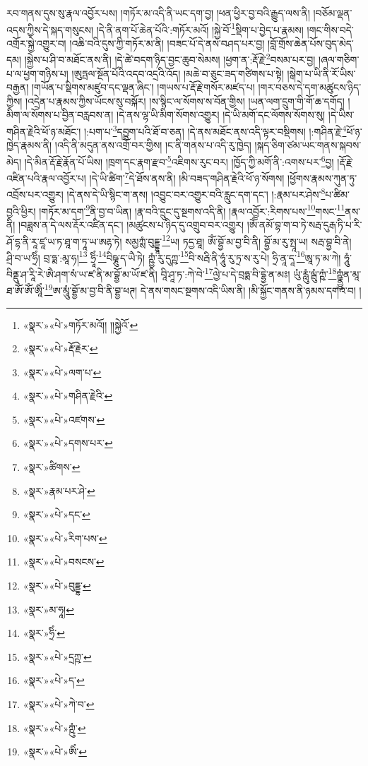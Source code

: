རབ་གནས་དུས་སུ་རྣལ་འབྱོར་པས། །གཏོར་མ་འདི་ནི་ཡང་དག་བྱ། །ཕན་ཕྱིར་བྱ་བའི་རྒྱུད་ལས་ནི། །བཅོམ་ལྡན་འདས་ཀྱིས་དེ་སྐད་གསུངས། །དེ་ནི་ནག་པོ་ཆེན་པོའི་:གཏོར་མའོ། །སྐྱེ་བོ་\footnote{«སྣར་»«པེ་»གཏོར་མའོ།། །།སྐྱེའོ་}སྡིག་པ་བྱེད་པ་རྣམས། །གང་གིས་བདེ་འགྲོར་སྐྱེ་འགྱུར་བ། །འཆི་བའི་དུས་ཀྱི་གཏོར་མ་ནི། །བཟང་པོ་དེ་ནས་བཤད་པར་བྱ། །བློ་གྲོས་ཆེན་པོས་བུད་མེད་དམ། །སྐྱེས་པ་ཤི་བ་མཐོང་ནས་ནི། །དེ་ཚེ་བདག་ཉིད་བྱང་ཆུབ་སེམས། །ཕྱག་ན་:རྡོ་རྗེ་\footnote{«སྣར་»«པེ་»རྡོ་རྗེར་}བསམ་པར་བྱ། །ཞལ་གཅིག་པ་ལ་ཕྱག་གཉིས་པ། །ཨུཏྤལ་སྔོན་པོའི་འདབ་འདྲའི་འོད། །མཆེ་བ་ཅུང་ཟད་གཙིགས་པ་སྟེ། །སྒེག་པ་ཡི་ནི་རོ་ཡིས་བརྒྱན། །གཡོན་པ་སྡིགས་མཛུབ་དང་ལྡན་ཞིང་། །གཡས་པ་རྡོ་རྗེ་གསོར་མཛད་པ། །གར་བཅས་དེ་དག་མཚུངས་ཉིད་ཀྱིས། །འདྲེན་པ་རྣམས་ཀྱིས་ཡོངས་སུ་བསྐོར། །ས་སྙིང་ལ་སོགས་ས་བོན་གྱིས། །ཡན་ལག་དྲུག་གི་གོ་ཆ་དགོད། །མིག་ལ་སོགས་པ་བྱིན་བརླབས་ན། །དེ་ནས་ལྷ་ཡི་མིག་སོགས་འགྱུར། །དེ་ཡི་མགོ་དང་ལོགས་སོགས་སུ། །དེ་ཡིས་གཤིན་རྗེའི་ཕོ་ཉ་མཐོང་། །:པག་པ་\footnote{«སྣར་»«པེ་»ལག་པ་}དབྱུག་པའི་ཐོ་བ་ཅན། །དེ་ནས་མཐོང་ནས་འདི་ལྟར་བསྡིགས། །:གཤིན་རྗེ་\footnote{«སྣར་»«པེ་»གཤིན་རྗེའི་}ཕོ་ཉ་ཁྱེད་རྣམས་ནི། །འདི་ནི་མདུན་ནས་འགྲོ་བར་གྱིས། །ང་ནི་གནས་པ་འདི་རུ་ཁྱེད། །སྐད་ཅིག་ཙམ་ཡང་གནས་སྐབས་མེད། །དེ་མིན་རྡོ་རྗེ་རྣོན་པོ་ཡིས། །ཁྲག་དང་རྣག་རྫབ་\footnote{«སྣར་»«པེ་»འཛགས་}འཇིགས་རུང་བར། །ཁྱོད་ཀྱི་མགོ་ནི་:འགས་པར་\footnote{«སྣར་»«པེ་»དགས་པར་}བྱ། །རྡོ་རྗེ་འཛིན་པའི་རྣལ་འབྱོར་པ། །དེ་ཡི་ཚིག་\footnote{«སྣར་»ཚིགས་}དེ་ཐོས་ནས་ནི། །མི་བཟད་གཤིན་རྗེའི་ཕོ་ཉ་སོགས། །ཕྱོགས་རྣམས་ཀུན་ཏུ་འབྲོས་པར་འགྱུར། །དེ་ནས་དེ་ཡི་སྙིང་ག་ནས། །འབྱུང་བར་འགྱུར་བའི་རླུང་དག་དང་། །:རྣམ་པར་ཤེས་\footnote{«སྣར་»རྣམ་པར་ཤེ་}པ་ཚིམ་བྱའི་ཕྱིར། །གཏོར་མ་དག་\footnote{«སྣར་»«པེ་»དང་}ནི་བྱ་བ་ཡིན། །རྣ་བའི་དྲུང་དུ་སྔགས་འདི་ནི། །རྣལ་འབྱོར་:རིགས་པས་\footnote{«སྣར་»«པེ་»རིག་པས་}གསང་\footnote{«སྣར་»«པེ་»བསངས་}ནས་ནི། །བཟླས་ན་དེ་ལས་རྡོར་འཛིན་དང་། །མཚུངས་པ་ཉིད་དུ་འགྲུབ་བར་འགྱུར། །ཨོཾ་ནམོ་བྷ་ག་བ་ཏེ་སརྦ་དུརྒ་ཏི་པ་རི་ཤོ་དྷ་ནི་རཱ་ཛཱ་ཡ་ཏ་ཐཱ་ག་ཏཱ་ཡ་ཨརྷ་ཏེ། སམྱཀྶཾ་བུདྡྷཱ་\footnote{«སྣར་»«པེ་»བུདྡྷ་}ཡ། ཏདྱ་ཐཱ། ཨོཾ་བྷྱོ་མ་བྱ་བི་ནི། བྷྱོ་མ་རུ་སྤཱ་ཡ། སརྦ་བྷྱ་བི་ནེ། ཤྲི་བ་ཡ་ཧྲིཾ། བྲ་ཧྨ་:མཱ་ཧ།\footnote{«སྣར་»མ་ཧཱ།} ཧྲཱིཾ་\footnote{«སྣར་»ཧྲིཾ་}བིཥྞུ་ད་ཡཻ་ཏེ། ཀྵྱཾ་རུ་དུཀྵ་\footnote{«སྣར་»«པེ་»དྲཀྵ་}བི་སརྦི་ནི་ཧཱུཾ་རུ་ཏྲ་ས་རུ་པེ། ཧྲི་ནཱ་དཱ་\footnote{«སྣར་»«པེ་»ད་}ཨཱ་ཏ་མ་ཀེ། ཧཱུཾ་བིནྡུ་ཤ་རཱི་རེ་ཨཻ་ཤག་སཾ་ཡ་ཛ་ནི་མ་བྷྱོ་མ་ཡོ་ཛ་ནི། བཱི་ཤཱ་ཏ་:ཀེ་བེ་\footnote{«སྣར་»«པེ་»ཀེ་བ་}ལྱེ་པ་དེ་བྲཧྨ་བི་དྷྱེ་ན་མཿ། ཡུཾ་རླུཾ་ལྦུཾ་ཀྵཾ་\footnote{«སྣར་»«པེ་»ཀྵུཾ་}ཀྵྣྱུཾན་མཱ་ཐ་ཨོཾ་ཨོཾ་ཨཱིཾ་\footnote{«སྣར་»«པེ་»ཨིཾ་}ཨ་མཱུཾ་བྷྱོ་མ་བྱ་བི་ནི་བྷྱ་ཕཊ། དེ་ནས་གསང་སྔགས་འདི་ཡིས་ནི། །མི་སྐྱོང་གནས་ནི་ཉམས་དགའ་བ། །

